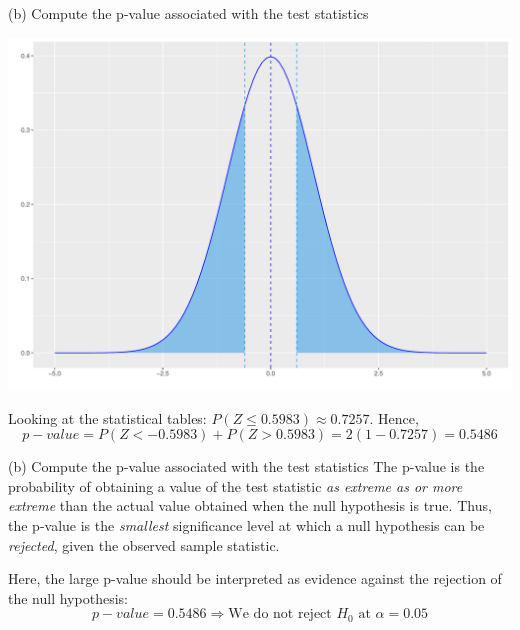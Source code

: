 \documentclass[
  10pt,
  ignorenonframetext,
]{beamer}
\begin{document}
\begin{frame}{(b) Compute the p-value associated with the test
statistics}
\protect\hypertarget{b-compute-the-p-value-associated-with-the-test-statistics}{}
\begin{center}\includegraphics[width=0.8\linewidth]{ECON1013_Tutorial-4-_files/figure-beamer/unnamed-chunk-2-1} \end{center}

Looking at the statistical tables:
\(P\left(Z\leq 0.5983\right)\approx 0.7257\). Hence, \[
p-value = P(Z < -0.5983) + P(Z > 0.5983) = 2(1-0.7257) = 0.5486
\]
\end{frame}

\begin{frame}{(b) Compute the p-value associated with the test
statistics}
\protect\hypertarget{b-compute-the-p-value-associated-with-the-test-statistics-1}{}
The p-value is the probability of obtaining a value of the test
statistic \textit{as extreme as or more extreme} than the actual value
obtained when the null hypothesis is true. Thus, the p-value is the
\textit{smallest} significance level at which a null hypothesis can be
\textit{rejected}, given the observed sample statistic.

Here, the large p-value should be interpreted as evidence against the
rejection of the null hypothesis: \[
p-value = 0.5486 \Longrightarrow \text{We do not reject } H_0 \text{ at } \alpha = 0.05
\]
\end{frame}
\end{document}
